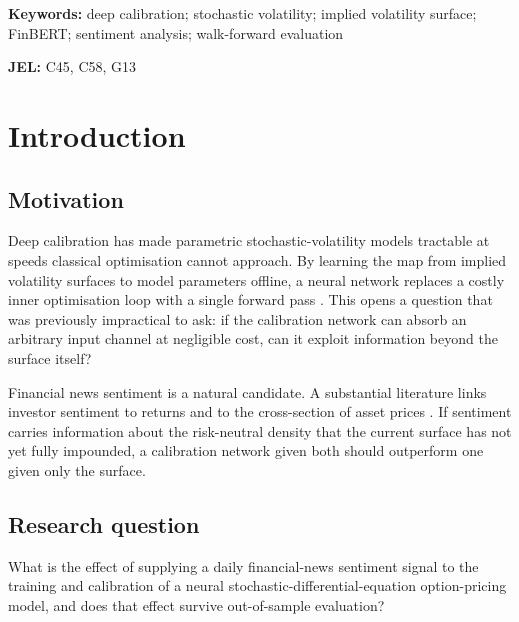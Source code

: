 \documentclass[11pt,a4paper]{article}
\begin{document}
\noindent\textbf{Keywords:} deep calibration; stochastic volatility; implied
volatility surface; FinBERT; sentiment analysis; walk-forward evaluation

\vspace{1em}
\noindent\textbf{JEL:} C45, C58, G13

\section{Introduction}

\subsection{Motivation}
Deep calibration has made parametric stochastic-volatility models tractable at
speeds classical optimisation cannot approach. By learning the map from implied
volatility surfaces to model parameters offline, a neural network replaces a
costly inner optimisation loop with a single forward pass
\citep{horvath2021,bayer2018}. This opens a question that was previously
impractical to ask: if the calibration network can absorb an arbitrary input
channel at negligible cost, can it exploit information beyond the surface itself?

Financial news sentiment is a natural candidate. A substantial literature links
investor sentiment to returns and to the cross-section of asset prices
\citep{baker2006,tetlock2007}. If sentiment carries information about the
risk-neutral density that the current surface has not yet fully impounded, a
calibration network given both should outperform one given only the surface.

\subsection{Research question}
What is the effect of supplying a daily financial-news sentiment signal to the
training and calibration of a neural stochastic-differential-equation
option-pricing model, and does that effect survive out-of-sample evaluation?
\end{document}
